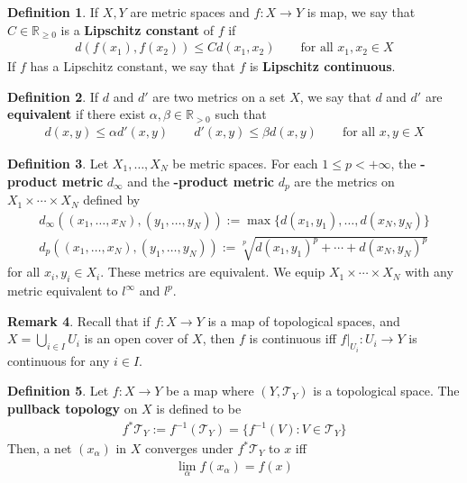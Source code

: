 \documentclass[12pt,b5paper,notitlepage]{article}
\theoremstyle{definition}
\newtheorem{df}{Definition}[subsection]
\newtheorem{rem}[df]{Remark}
\theoremstyle{plain}
\newcommand{\mc}{\mathcal}
\newcommand{\Rbb}{\mathbb R}
\numberwithin{equation}{section}
\begin{document}
\begin{df}
If $X,Y$ are metric spaces and $f:X\rightarrow Y$ is map, we say that $C\in\Rbb_{\geq0}$ is a \textbf{Lipschitz constant}  of $f$ if
\begin{align*}
d(f(x_1),f(x_2))\leq Cd(x_1,x_2)\qquad\text{for all }x_1,x_2\in X
\end{align*}
If $f$ has a Lipschitz constant, we say that $f$ is \textbf{Lipschitz continuous}. 
\end{df}


\begin{df}
If $d$ and $d'$ are two metrics on a set $X$, we say that $d$ and $d'$ are \textbf{equivalent}  if there exist $\alpha,\beta\in\Rbb_{>0}$ such that
\begin{align*}
d(x,y)\leq \alpha d'(x,y)\qquad d'(x,y)\leq\beta d(x,y)\qquad\text{for all }x,y\in X
\end{align*}
\end{df}

\begin{df}\label{lb33}
Let $X_1,\dots,X_N$ be metric spaces. For each $1\leq p<+\infty$, the \textbf{-product metric} $d_\infty$  and the \textbf{-product metric}  $d_p$ are the metrics on $X_1\times\cdots\times X_N$ defined by
\begin{gather*}
d_\infty((x_1,\dots,x_N),(y_1,\dots,y_N)):=\max\{d(x_1,y_1),\dots,d(x_N,y_N)\}\\
d_p((x_1,\dots,x_N),(y_1,\dots,y_N)):=\sqrt[p]{d(x_1,y_1)^p+\cdots+d(x_N,y_N)^p}
\end{gather*}
for all $x_i,y_i\in X_i$. These metrics are equivalent. We equip $X_1\times\cdots\times X_N$ with any metric equivalent to $l^\infty$ and $l^p$.
\end{df}

\begin{rem}\label{lb34}
Recall that if $f:X\rightarrow Y$ is a map of topological spaces, and $X=\bigcup_{i\in I} U_i$ is an open cover of $X$, then $f$ is continuous iff $f|_{U_i}:U_i\rightarrow Y$ is continuous for any $i\in I$.
\end{rem}


\begin{df}
Let $f:X\rightarrow Y$ be a map where $(Y,\mc T_Y)$ is a topological space. The \textbf{pullback topology}  on $X$ is defined to be
\begin{align*}
f^*\mc T_Y:=f^{-1}(\mc T_Y)=\{f^{-1}(V):V\in\mc T_Y\}
\end{align*}
Then, a net $(x_\alpha)$ in $X$ converges under $f^*\mc T_Y$ to $x$ iff
\begin{align*}
\lim_\alpha f(x_\alpha)=f(x)
\end{align*}
\end{df}
\end{document}
